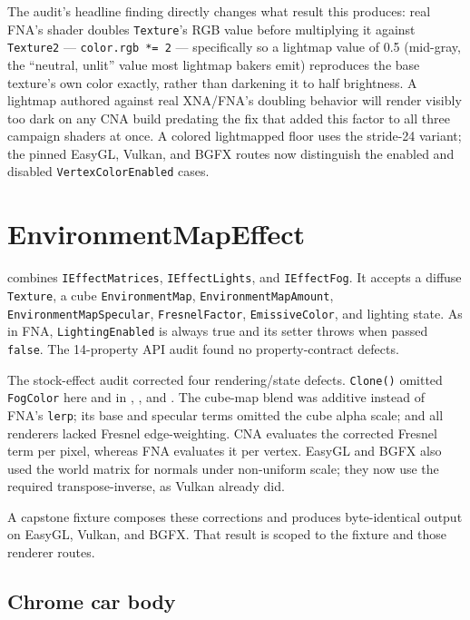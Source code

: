 The audit's headline finding directly changes what result this produces: real FNA's shader
doubles \texttt{Texture}'s RGB value before multiplying it against \texttt{Texture2} ---
\texttt{color.rgb *= 2} --- specifically so a lightmap value of 0.5 (mid-gray, the ``neutral,
unlit'' value most lightmap bakers emit) reproduces the base texture's own color exactly, rather
than darkening it to half brightness. A lightmap authored against real XNA/FNA's doubling
behavior will render visibly too dark on any CNA build predating the fix that added this factor
to all three campaign shaders at once. A colored lightmapped floor uses the stride-24
variant; the pinned EasyGL, Vulkan, and BGFX routes now distinguish the enabled and disabled
\texttt{VertexColorEnabled} cases.

\section{EnvironmentMapEffect}

 combines \texttt{IEffectMatrices}, \texttt{IEffectLights}, and
\texttt{IEffectFog}. It accepts a diffuse \texttt{Texture}, a cube
\texttt{EnvironmentMap}, \texttt{EnvironmentMapAmount},
\texttt{EnvironmentMapSpecular}, \texttt{FresnelFactor}, \texttt{EmissiveColor}, and lighting
state. As in FNA, \texttt{LightingEnabled} is always true and its setter throws when passed
\texttt{false}. The 14-property API audit found no property-contract defects.

\begin{historynote}
The stock-effect audit corrected four rendering/state defects. \texttt{Clone()} omitted
\texttt{FogColor} here and in , , and
. The cube-map blend was additive instead of FNA's \texttt{lerp}; its
base and specular terms omitted the cube alpha scale; and all renderers lacked Fresnel
edge-weighting. CNA evaluates the corrected Fresnel term per pixel, whereas FNA evaluates it per
vertex. EasyGL and BGFX also used the world matrix for normals under non-uniform scale; they now
use the required transpose-inverse, as Vulkan already did.
\end{historynote}

A capstone fixture composes these corrections and produces byte-identical output on EasyGL,
Vulkan, and BGFX. That result is scoped to the fixture and those renderer routes.

\subsection{Chrome car body}

